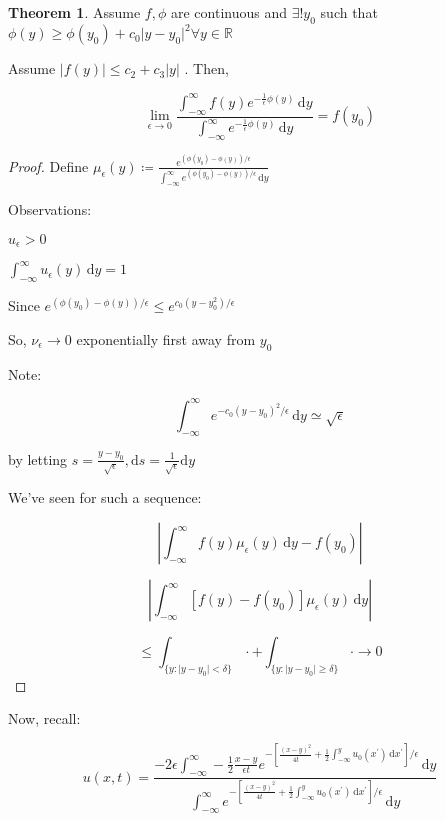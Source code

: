 \documentclass{article}
\theoremstyle{definition}
\newtheorem{theorem}{Theorem}
\begin{document}
\begin{theorem}
    Assume \(f, \phi\) are continuous and \(\exists ! y_0\) such that \(\phi(y) \geq \phi(y_0) + c_0 \vert y - y_0 \vert ^2 \forall y\in\mathbb{R}\)
    
    Assume \(\vert f(y) \vert \leq c_2 + c_3 \vert y \vert\) . Then,

    \[
        \lim_{\epsilon \to 0} \frac{ \int_{-\infty}^{\infty} f(y) e^{ - \frac{1}{\epsilon}\phi(y)} \,\mathrm{d}y }{\int_{-\infty}^{\infty} e^{-\frac{1}{\epsilon}\phi(y)} \,\mathrm{d}y } = f(y_0)
    \]
\end{theorem}

\begin{proof}
    Define \(\mu_{\epsilon}(y) \coloneqq \frac{e^{(\phi(y_0)-\phi(y)) / \epsilon}}{\int_{-\infty}^{\infty} e^{(\phi(y_0) - \phi(y)) / \epsilon} \,\mathrm{d}y } \) 

    Observations:

    \(u_{\epsilon} > 0 \)
    
    \(\int_{-\infty}^{\infty} u_{\epsilon}(y) \,\mathrm{d}y = 1\)
    
    Since \(e^{(\phi(y_0)-\phi(y)) / \epsilon} \leq e^{c_0(y - y_0^2) / \epsilon}\) 

    So, \(\nu_{\epsilon} \to 0\) exponentially first away from \(y_0\)
    
    Note:

    \[
        \int_{-\infty}^{\infty} e^{- c_0(y - y_0)^2 / \epsilon} \,\mathrm{d}y \simeq \sqrt{\epsilon}  
    \]

    by letting \(s = \frac{y - y_0}{\sqrt{\epsilon}}, \mathrm{d} s = \frac{1}{\sqrt{\epsilon}}\mathrm{d} y\)
    
    We've seen for such a sequence:

    \[
        \left\vert\int_{-\infty}^{\infty} f(y) \mu_{\epsilon}(y)\,\mathrm{d}y - f(y_0)\right\vert 
    \]

    \[
        \left\vert\int_{-\infty}^{\infty} [f(y)-f(y_0)] \mu_{\epsilon}(y)\,\mathrm{d}y\right\vert 
    \]

    \[
        \leq \int_{\{ y : \vert y - y_0 \vert < \delta \} } \cdot + \int_{\{ y : \vert y - y_0 \vert \geq \delta \} } \cdot \to 0
    \]

\end{proof}

Now, recall:

\[
    u(x,t) = \frac{ - 2 \epsilon \int_{-\infty}^{\infty} -\frac{1}{2} \frac{x-y}{\epsilon t} e^{-\left[ \frac{(x-y)^2}{4t} + \frac{1}{2} \int_{-\infty}^{y} u_0(x^{\prime}) \,\mathrm{d}x^{\prime} \right]  \big/ \epsilon} \,\mathrm{d}y}{ \int_{-\infty}^{\infty} e^{-\left[ \frac{(x-y)^2}{4t} + \frac{1}{2} \int_{-\infty}^{y} u_0(x^{\prime}) \,\mathrm{d}x^{\prime} \right]  \big/ \epsilon} \,\mathrm{d}y }
\]
\end{document}
